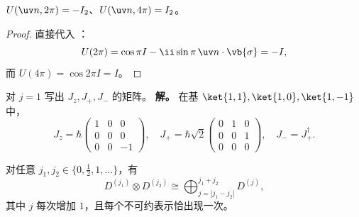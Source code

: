 \begin{proposition}
 $U(\uv n,2\pi)=-I_2$、$U(\uv n,4\pi)=I_2$。
\end{proposition}

\begin{proof}
直接代入 ：
\[
U(2\pi)=\cos\pi I-\ii\sin\pi\,\uv n\cdot\vb{\sigma}=-I,
\]
而 $U(4\pi)=\cos2\pi I=I$。
\end{proof}


\begin{workedexample}
对 $j=1$ 写出 $J_z,J_+,J_-$ 的矩阵。
\textbf{解。} 在基 $\ket{1,1},\ket{1,0},\ket{1,-1}$ 中，
\[
J_z=\hbar\begin{pmatrix}1&0&0\\0&0&0\\0&0&-1\end{pmatrix},
\quad
J_+=\hbar\sqrt2
\begin{pmatrix}0&1&0\\0&0&1\\0&0&0\end{pmatrix},
\quad
J_-=J_+^\dagger.
\]
\end{workedexample}

\begin{theorem}
对任意 $j_1,j_2\in\{0,\tfrac12,1,\dots\}$，有
\begin{equation}
D^{(j_1)}\otimes D^{(j_2)}
\cong
\bigoplus_{j=|j_1-j_2|}^{j_1+j_2}D^{(j)},
\label{eq:cg-decomposition}
\end{equation}
其中 $j$ 每次增加 $1$，且每个不可约表示恰出现一次。

\end{theorem}

